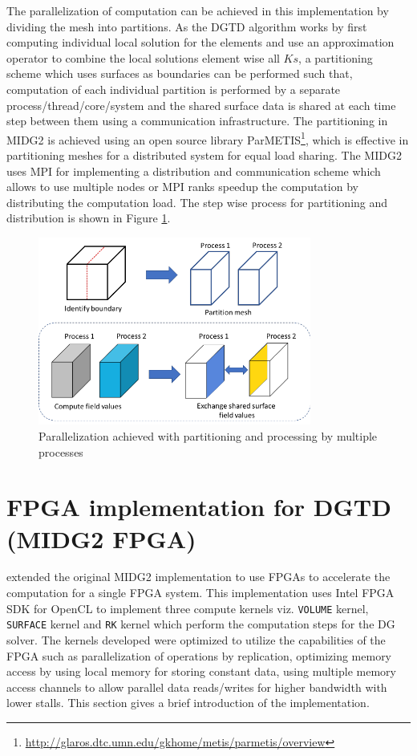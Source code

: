 The parallelization of computation can be achieved in this implementation by dividing
the mesh into partitions. As the \ac{DGTD} algorithm works by first computing individual
local solution for the elements and use an approximation operator to combine the local
solutions element wise all $Ks$,
a partitioning scheme which uses surfaces as boundaries can be performed such that,
computation of each individual partition is performed by a separate
process/thread/core/system and the shared surface data is shared at each time step
between them using a communication infrastructure. The partitioning in MIDG2 is
achieved using an open source library ParMETIS\footnote{\url{http://glaros.dtc.umn.edu/gkhome/metis/parmetis/overview}},
which is effective in partitioning meshes for a distributed system for equal load sharing.
The MIDG2 uses \ac{MPI} for implementing a distribution and communication scheme which
allows to use multiple nodes or MPI ranks speedup the computation by distributing the computation load.
The step wise process for partitioning and distribution is shown in Figure \ref{fig:partitioning}.
\begin{figure}[h]%
    \centering
    \includegraphics[width=0.8\textwidth]{images/partition_proc}
    \caption{Parallelization achieved with partitioning and processing by multiple processes}
    \label{fig:partitioning}
\end{figure}

\section{FPGA implementation for DGTD (MIDG2 FPGA)}
\label{sec:fpga_dg}

\textcite{kenter_opencl-based_2018} extended the original MIDG2 implementation to use
FPGAs to accelerate the computation for a single FPGA system. This implementation
uses Intel FPGA SDK for OpenCL to implement three compute kernels viz. \texttt{VOLUME} kernel,
\texttt{SURFACE} kernel and \texttt{RK} kernel which perform the computation steps for the \ac{DG} solver.
The kernels developed were optimized to utilize the capabilities of the FPGA such
as parallelization of operations by replication, optimizing memory access by using
local memory for storing constant data, using multiple memory access channels to allow parallel data
reads/writes for higher bandwidth with lower stalls. This section gives a brief
introduction of the implementation.

